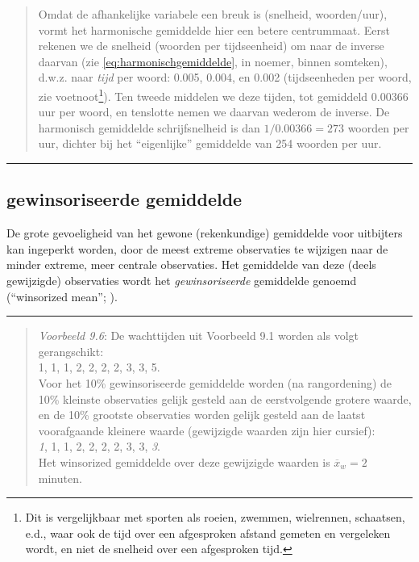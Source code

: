 \documentclass[
]{book}
\begin{document}
\begin{quote}
Omdat de afhankelijke variabele een breuk is (snelheid, woorden/uur),
vormt het harmonische gemiddelde hier een betere centrummaat. Eerst
rekenen we de snelheid (woorden per tijdseenheid) om naar de inverse
daarvan (zie \eqref{eq:harmonischgemiddelde}, in noemer, binnen somteken),
d.w.z. naar \emph{tijd} per woord: 0.005, 0.004, en 0.002 (tijdseenheden per
woord, zie voetnoot\footnote{Dit is vergelijkbaar met sporten als roeien, zwemmen, wielrennen, schaatsen, e.d., waar ook de tijd over een afgesproken afstand gemeten en vergeleken wordt, en niet de snelheid over een afgesproken tijd.}). Ten tweede middelen we deze tijden, tot
gemiddeld 0.00366 uur per woord, en tenslotte nemen we daarvan wederom
de inverse. De harmonisch gemiddelde schrijfsnelheid is dan \(1/0.00366=273\)
woorden per uur, dichter bij het ``eigenlijke'' gemiddelde van 254 woorden
per uur.
\end{quote}

\begin{center}\rule{0.5\linewidth}{0.5pt}\end{center}

\hypertarget{gewinsoriseerde-gemiddelde}{%
\subsection{gewinsoriseerde gemiddelde}\label{gewinsoriseerde-gemiddelde}}

De grote gevoeligheid van het gewone (rekenkundige) gemiddelde voor
uitbijters kan ingeperkt worden, door de meest extreme observaties te
wijzigen naar de minder extreme, meer centrale observaties. Het
gemiddelde van deze (deels gewijzigde) observaties wordt het
\emph{gewinsoriseerde} gemiddelde genoemd (``winsorized mean''; ).

\begin{center}\rule{0.5\linewidth}{0.5pt}\end{center}

\begin{quote}
\emph{Voorbeeld 9.6}: De wachttijden uit Voorbeeld 9.1
worden als volgt gerangschikt:\\
1, 1, 1, 2, 2, 2, 2, 3, 3, 5.\\
Voor het 10\% gewinsoriseerde gemiddelde worden (na rangordening) de 10\%
kleinste observaties gelijk gesteld aan de eerstvolgende grotere waarde,
en de 10\% grootste observaties worden gelijk gesteld aan de laatst
voorafgaande kleinere waarde (gewijzigde waarden zijn hier cursief):\\
\emph{1}, 1, 1, 2, 2, 2, 2, 3, 3, \emph{3}.\\
Het winsorized gemiddelde over deze gewijzigde waarden is
\(\overline{x}_w=2\) minuten.
\end{quote}
\end{document}
